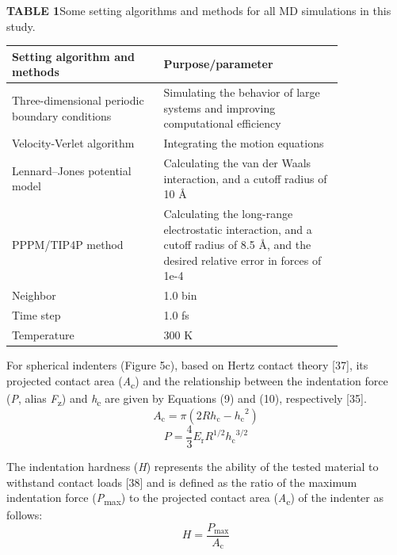\documentclass{article}
\begin{document}
\noindent\textbf{TABLE 1}\quad Some setting algorithms and methods for all MD simulations in this study.

\begin{center}\small
\begin{tabular}{p{0.38\linewidth}p{0.45\linewidth}}
\toprule
\textbf{Setting algorithm and methods} & \textbf{Purpose/parameter} \\
\midrule
Three-dimensional periodic boundary conditions & Simulating the behavior of large systems and improving computational efficiency \\
Velocity-Verlet algorithm & Integrating the motion equations \\
Lennard–Jones potential model & Calculating the van der Waals interaction, and a cutoff radius of 10 Å \\
PPPM/TIP4P method & Calculating the long-range electrostatic interaction, and a cutoff radius of 8.5 Å, and the desired relative error in forces of 1e-4 \\
Neighbor & 1.0 bin \\
Time step & 1.0 fs \\
Temperature & 300 K \\
\bottomrule
\end{tabular}
\end{center}

For spherical indenters (Figure 5c), based on Hertz contact theory [37], its projected contact area (\emph{A}\textsubscript{c}) and the relationship between the indentation force (\emph{P}, alias \emph{F}\textsubscript{z}) and \emph{h}\textsubscript{c} are given by Equations (9) and (10), respectively [35].
\begin{equation}
A_{\mathrm{c}} = \pi\left(2Rh_{\mathrm{c}} - {h_{\mathrm{c}}}^2\right) \tag{9}
\end{equation}
\begin{equation}
P = \frac{4}{3}E_{\mathrm{r}}R^{1/2}{h_{\mathrm{c}}}^{3/2} \tag{10}
\end{equation}

The indentation hardness (\emph{H}) represents the ability of the tested material to withstand contact loads [38] and is defined as the ratio of the maximum indentation force (\emph{P}\textsubscript{max}) to the projected contact area (\emph{A}\textsubscript{c}) of the indenter as follows:
\begin{equation}
H = \frac{P_{\mathrm{max}}}{A_{\mathrm{c}}} \tag{11}
\end{equation}
\end{document}

